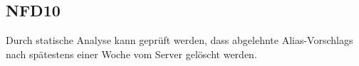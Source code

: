 \subsection*{NFD10}
Durch \gls{statische Analyse} kann geprüft werden, dass abgelehnte \Glspl{Alias-Vorschlag} nach spätestens einer Woche vom \Gls{Server} gelöscht werden.